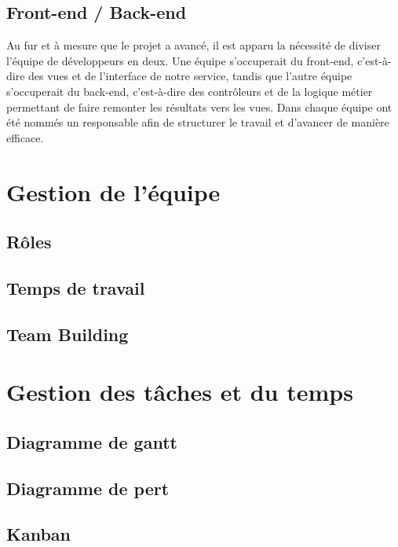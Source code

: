 \documentclass[asi]{picInsa}
\begin{document}
\subsection{Front-end / Back-end}
Au fur et à mesure que le projet a avancé, il est apparu la nécessité de diviser l'équipe de développeurs en deux. Une équipe s'occuperait du front-end, c'est-à-dire des vues et de l'interface de notre service, tandis que l'autre équipe s'occuperait du back-end, c'est-à-dire des contrôleurs et de la logique métier permettant de faire remonter les résultats vers les vues. Dans chaque équipe ont été nommés un responsable afin de structurer le travail et d'avancer de manière efficace.



\section{Gestion de l'équipe}
\subsection{Rôles}

\subsection{Temps de travail}

\subsection{Team Building}



\section{Gestion des tâches et du temps}
\subsection{Diagramme de gantt}

\subsection{Diagramme de pert}

\subsection{Kanban}
\end{document}
